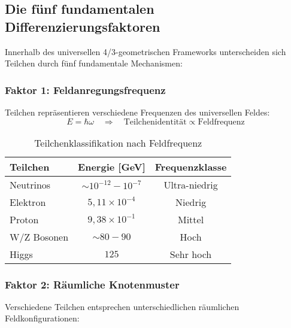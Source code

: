 \documentclass[12pt,a4paper]{article}
\newcommand{\myomega}{\ensuremath{\omega}}
\newcommand{\mytimes}{\ensuremath{\times}}
\newcommand{\myRightarrow}{\ensuremath{\Rightarrow}}
\newcommand{\mypropto}{\ensuremath{\propto}}
\newcommand{\mysim}{\ensuremath{\sim}}
\begin{document}
	\subsection{Die fünf fundamentalen Differenzierungsfaktoren}
	\label{subsec:fuenf_faktoren}
	
	Innerhalb des universellen 4/3-geometrischen Frameworks unterscheiden sich Teilchen durch fünf fundamentale Mechanismen:
	
	\subsubsection{Faktor 1: Feldanregungsfrequenz}
	\label{subsubsec:anregungsfrequenz}
	
	Teilchen repräsentieren verschiedene Frequenzen des universellen Feldes:
	\begin{equation}
		E = \hbar \myomega \quad \myRightarrow \quad \text{Teilchenidentität} \mypropto \text{Feldfrequenz}
		\label{eq:frequenz_identitaet}
	\end{equation}
	
	\begin{table}[htbp]
		\centering
		\begin{tabular}{lcc}
			\toprule
			\textbf{Teilchen} & \textbf{Energie [GeV]} & \textbf{Frequenzklasse} \\
			\midrule
			Neutrinos & $\mysim 10^{-12} - 10^{-7}$ & Ultra-niedrig \\
			Elektron & $5,11 \mytimes 10^{-4}$ & Niedrig \\
			Proton & $9,38 \mytimes 10^{-1}$ & Mittel \\
			W/Z Bosonen & $\mysim 80-90$ & Hoch \\
			Higgs & $125$ & Sehr hoch \\
			\bottomrule
		\end{tabular}
		\caption{Teilchenklassifikation nach Feldfrequenz}
		\label{tab:frequenz_klassifikation}
	\end{table}
	
	\subsubsection{Faktor 2: Räumliche Knotenmuster}
	\label{subsubsec:raeumliche_muster}
	
	Verschiedene Teilchen entsprechen unterschiedlichen räumlichen Feldkonfigurationen:
	
\end{document}
